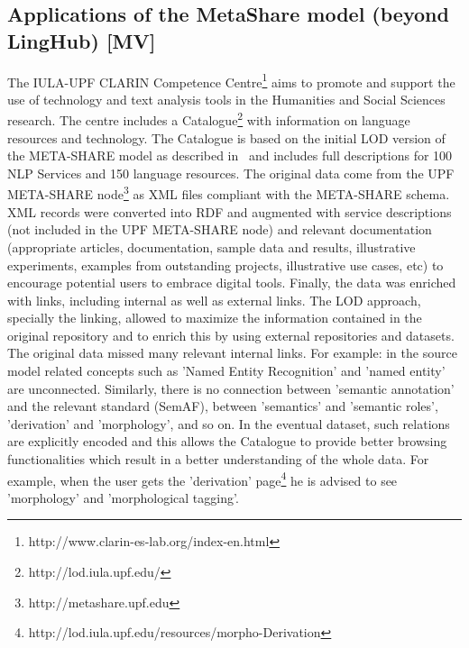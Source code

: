 \documentclass{llncs}
\begin{document}
{{\subsection{Applications of the MetaShare model (beyond LingHub) [MV]}
\label{sec:applications}
The IULA-UPF CLARIN Competence Centre\footnote{http://www.clarin-es-lab.org/index-en.html} aims to promote and support the use of technology and text analysis tools in the Humanities and Social Sciences research. The centre includes a Catalogue\footnote{http://lod.iula.upf.edu/} with information on language resources and technology.
The Catalogue is based on the initial LOD version of the META-SHARE model as described in~\cite{Villegas2014} and includes full descriptions for 100 NLP Services and 150 language resources. The original data come from the UPF META-SHARE node\footnote{http://metashare.upf.edu} as XML files compliant with the META-SHARE schema. XML records were converted into RDF and augmented with service descriptions (not included in the UPF META-SHARE node) and relevant documentation (appropriate articles, documentation, sample data and results, illustrative experiments, examples from outstanding projects, illustrative use cases, etc) to encourage potential users to embrace digital tools. Finally, the data was enriched with links, including internal as well as external links.
The LOD approach, specially the linking, allowed to maximize the information contained in the original repository and to enrich this by using external repositories and datasets. The original data missed many relevant internal links. For example: in the source model related concepts such as 'Named Entity Recognition' and 'named entity' are unconnected. Similarly, there is no connection between 'semantic annotation' and the relevant standard (SemAF), between 'semantics' and 'semantic roles', 'derivation' and 'morphology', and so on. In the eventual dataset, such relations are explicitly encoded and this allows the Catalogue to provide better browsing functionalities which result in a better understanding of the whole data. For example, when the user gets the 'derivation' page\footnote{http://lod.iula.upf.edu/resources/morpho-Derivation} he is advised to see 'morphology' and 'morphological tagging'.
}}
\end{document}
